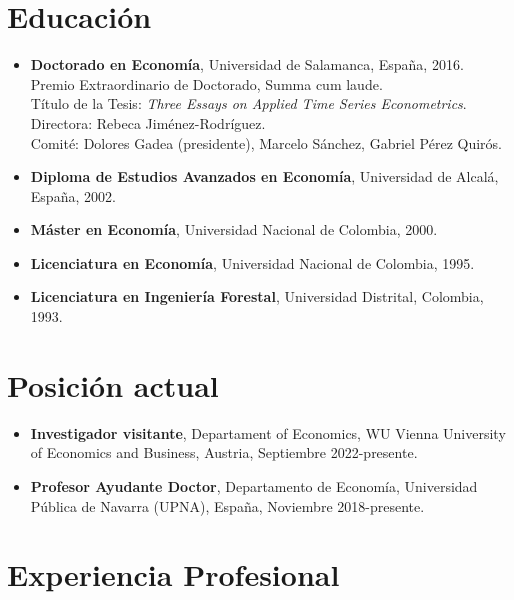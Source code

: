 \documentclass[11pt]{article}\usepackage[]{graphicx}\usepackage[usenames,dvipsnames]{xcolor}
\begin{document}
{%
\section{Educación} 

\begin{itemize}
  \item {\textbf{Doctorado en Economía}, Universidad de Salamanca, España, 2016.\\
  Premio Extraordinario de Doctorado, Summa cum laude.\\
  Título de la Tesis: \emph{Three Essays on Applied Time Series Econometrics}.\\
  Directora: Rebeca Jiménez-Rodríguez.\\
  Comité: Dolores Gadea (presidente), Marcelo Sánchez, Gabriel Pérez Quirós}.
  \item \textbf{Diploma de Estudios Avanzados en Economía}, Universidad de Alcalá, España, 2002.
  \item \textbf{Máster en Economía}, Universidad Nacional de Colombia, 2000.
  \item \textbf{Licenciatura en Economía}, Universidad Nacional de Colombia, 1995.
  \item \textbf{Licenciatura en Ingeniería Forestal}, Universidad Distrital, Colombia, 1993.
\end{itemize}

\section{Posición actual} 

\begin{itemize}
\item\textbf{Investigador visitante}, Departament of Economics, WU Vienna University of Economics and Business, Austria, Septiembre 2022-presente.\\

\item\textbf{Profesor Ayudante Doctor}, Departamento de Economía, Universidad Pública de Navarra (UPNA), España, Noviembre 2018-presente.\\
\end{itemize}

\section{Experiencia Profesional} 

}
\end{document}
